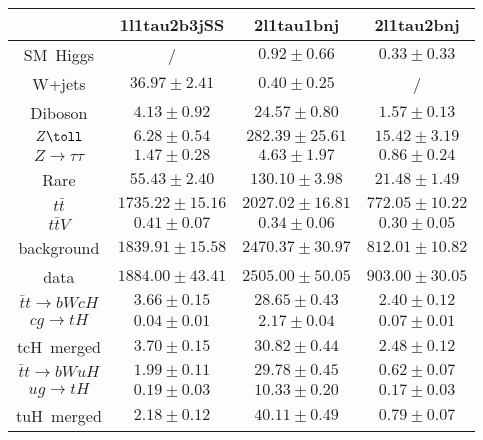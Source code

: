 \begin{tabular}{|c|c|c|c|} \hline
 & 1l1tau2b3jSS & 2l1tau1bnj & 2l1tau2bnj\\\hline
SM~Higgs &  / & $0.92\pm0.66$ & $0.33\pm0.33$\\\hline
W+jets & $36.97\pm2.41$ & $0.40\pm0.25$ &  /\\\hline
Diboson & $4.13\pm0.92$ & $24.57\pm0.80$ & $1.57\pm0.13$\\\hline
$Z\toll$ & $6.28\pm0.54$ & $282.39\pm25.61$ & $15.42\pm3.19$\\\hline
$Z\to\tau\tau$ & $1.47\pm0.28$ & $4.63\pm1.97$ & $0.86\pm0.24$\\\hline
Rare & $55.43\pm2.40$ & $130.10\pm3.98$ & $21.48\pm1.49$\\\hline
$t\bar{t}$ & $1735.22\pm15.16$ & $2027.02\pm16.81$ & $772.05\pm10.22$\\\hline
$t\bar{t}V$ & $0.41\pm0.07$ & $0.34\pm0.06$ & $0.30\pm0.05$\\\hline
background & $1839.91\pm15.58$ & $2470.37\pm30.97$ & $812.01\pm10.82$\\\hline
data & $1884.00\pm43.41$ & $2505.00\pm50.05$ & $903.00\pm30.05$\\\hline
$\bar{t}t\to bWcH$ & $3.66\pm0.15$ & $28.65\pm0.43$ & $2.40\pm0.12$\\\hline
$cg\to tH$ & $0.04\pm0.01$ & $2.17\pm0.04$ & $0.07\pm0.01$\\\hline
tcH~merged & $3.70\pm0.15$ & $30.82\pm0.44$ & $2.48\pm0.12$\\\hline
$\bar{t}t\to bWuH$ & $1.99\pm0.11$ & $29.78\pm0.45$ & $0.62\pm0.07$\\\hline
$ug\to tH$ & $0.19\pm0.03$ & $10.33\pm0.20$ & $0.17\pm0.03$\\\hline
tuH~merged & $2.18\pm0.12$ & $40.11\pm0.49$ & $0.79\pm0.07$\\\hline
\end{tabular}
